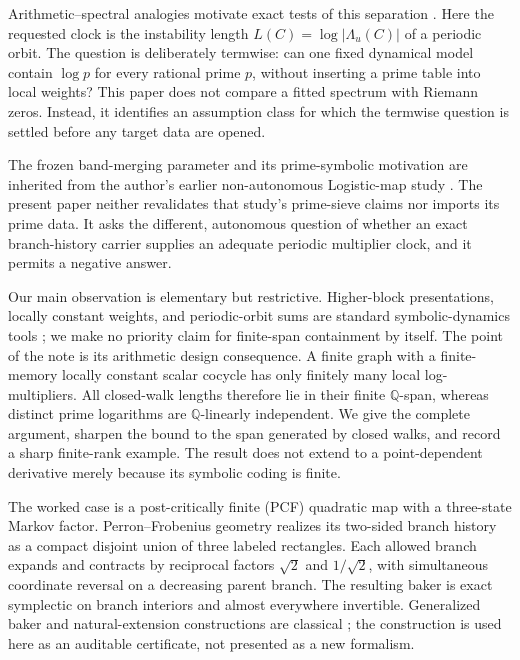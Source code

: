 \documentclass[11pt]{article}
\theoremstyle{definition}
\theoremstyle{remark}
\newcommand{\Q}{\mathbb{Q}}
\begin{document}
Arithmetic--spectral analogies motivate exact tests of this separation
\citep{berry1999riemann}.  Here the requested clock is the instability length
\(L(C)=\log|\Lambda_u(C)|\) of a periodic orbit.  The question is deliberately
termwise: can one fixed dynamical model contain \(\log p\) for every rational
prime \(p\), without inserting a prime table into local weights?  This paper
does not compare a fitted spectrum with Riemann zeros.  Instead, it identifies
an assumption class for which the termwise question is settled before any
target data are opened.

The frozen band-merging parameter and its prime-symbolic motivation are
inherited from the author's earlier non-autonomous Logistic-map study
\citep{wang2026prime}.  The present paper neither revalidates that study's
prime-sieve claims nor imports its prime data.  It asks the different,
autonomous question of whether an exact branch-history carrier supplies an
adequate periodic multiplier clock, and it permits a negative answer.

Our main observation is elementary but restrictive.  Higher-block
presentations, locally constant weights, and periodic-orbit sums are standard
symbolic-dynamics tools \citep{lind2021symbolic,parry1990zeta,marcus1991weight};
we make no priority claim for finite-span containment by itself.  The point of
the note is its arithmetic design consequence.  A finite graph with a
finite-memory locally constant scalar cocycle has only finitely many local
log-multipliers.  All closed-walk lengths therefore lie in their finite
\(\Q\)-span, whereas distinct prime logarithms are \(\Q\)-linearly
independent.  We give the complete argument, sharpen the bound to the span
generated by closed walks, and record a sharp finite-rank example.  The result
does not extend to a point-dependent derivative merely because its symbolic
coding is finite.

The worked case is a post-critically finite (PCF) quadratic map with a
three-state Markov factor.  Perron--Frobenius geometry realizes its two-sided
branch history as a compact disjoint union of three labeled rectangles.  Each
allowed branch expands and contracts by reciprocal factors \(\sqrt2\) and
\(1/\sqrt2\), with simultaneous coordinate reversal on a decreasing parent
branch.  The resulting baker is exact symplectic on branch interiors and
almost everywhere invertible.  Generalized baker and natural-extension
constructions are classical \citep{bose1989generalized,bruin2014natural}; the
construction is used here as an auditable certificate, not presented as a new
formalism.
\end{document}
